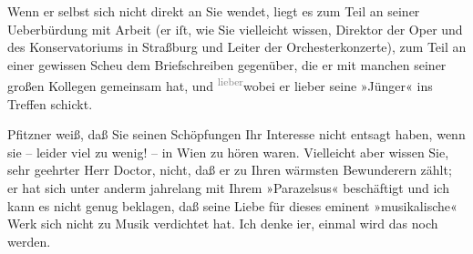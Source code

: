 \pstart
           Wenn er selbst sich nicht direkt an Sie wendet, liegt es zum Teil an seiner
               Ueberbürdung mit Arbeit (er iſt, wie Sie vielleicht wissen, Direktor der Oper und des Konservatoriums in Straßburg und Leiter
               der Orchesterkonzerte), zum Teil an einer
               gewissen Scheu dem Briefschreiben gegenüber, die er mit {\pb}manchen seiner großen Kollegen gemeinsam hat, und \substVorne{}\textsuperscript{\textcolor{gray}{lieber}}\substDazwischen{}wobei\substHinten{} er lieber seine »Jünger« ins Treffen schickt.\pend
           
\pstart
           Pfitzner weiß, daß Sie seinen Schöpfungen Ihr
               Interesse nicht entsagt haben, wenn sie – leider viel zu wenig! – in Wien zu hören waren. Vielleicht aber wissen Sie, sehr geehrter
               Herr Doctor, nicht, daß er zu Ihren wärmsten Bewunderern zählt; er hat sich unter
               anderm jahrelang mit Ihrem »Parazelsus«
               beschäftigt und ich kann es nicht genug beklagen, daß seine Liebe für dieses eminent
               »musikalische« Werk sich nicht zu Musik verdichtet hat. Ich denke i{\geminationm}er, einmal wird das noch werden.\pend
           
